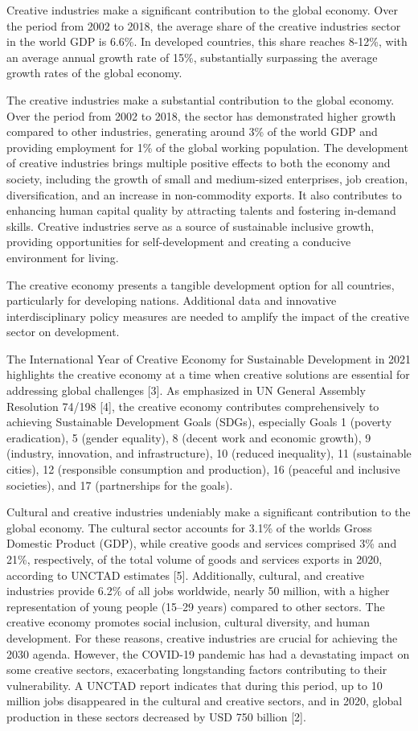 Creative industries make a significant contribution to the global
economy. Over the period from 2002 to 2018, the average share of the
creative industries sector in the world GDP is 6.6\%. In developed
countries, this share reaches 8-12\%, with an average annual growth rate
of 15\%, substantially surpassing the average growth rates of the global
economy.

The creative industries make a substantial contribution to the global
economy. Over the period from 2002 to 2018, the sector has demonstrated
higher growth compared to other industries, generating around 3\% of the
world GDP and providing employment for 1\% of the global working
population. The development of creative industries brings multiple
positive effects to both the economy and society, including the growth
of small and medium-sized enterprises, job creation, diversification,
and an increase in non-commodity exports. It also contributes to
enhancing human capital quality by attracting talents and fostering
in-demand skills. Creative industries serve as a source of sustainable
inclusive growth, providing opportunities for self-development and
creating a conducive environment for living.

The creative economy presents a tangible development option for all
countries, particularly for developing nations. Additional data and
innovative interdisciplinary policy measures are needed to amplify the
impact of the creative sector on development.

The International Year of Creative Economy for Sustainable Development
in 2021 highlights the creative economy at a time when creative
solutions are essential for addressing global challenges {[}3{]}. As
emphasized in UN General Assembly Resolution 74/198 {[}4{]}, the
creative economy contributes comprehensively to achieving Sustainable
Development Goals (SDGs), especially Goals 1 (poverty eradication), 5
(gender equality), 8 (decent work and economic growth), 9 (industry,
innovation, and infrastructure), 10 (reduced inequality), 11
(sustainable cities), 12 (responsible consumption and production), 16
(peaceful and inclusive societies), and 17 (partnerships for the goals).

Cultural and creative industries undeniably make a significant
contribution to the global economy. The cultural sector accounts for
3.1\% of the world\textquotesingle s Gross Domestic Product (GDP), while
creative goods and services comprised 3\% and 21\%, respectively, of the
total volume of goods and services exports in 2020, according to UNCTAD
estimates {[}5{]}. Additionally, cultural, and creative industries
provide 6.2\% of all jobs worldwide, nearly 50 million, with a higher
representation of young people (15--29 years) compared to other sectors.
The creative economy promotes social inclusion, cultural diversity, and
human development. For these reasons, creative industries are crucial
for achieving the 2030 agenda. However, the COVID-19 pandemic has had a
devastating impact on some creative sectors, exacerbating longstanding
factors contributing to their vulnerability. A UNCTAD report indicates
that during this period, up to 10 million jobs disappeared in the
cultural and creative sectors, and in 2020, global production in these
sectors decreased by USD 750 billion {[}2{]}.


